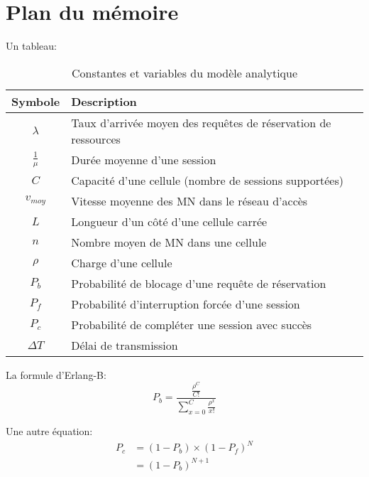 \section{Plan du mémoire}  %
Un tableau:
\begin{table}[htbp]
  \centering
  \caption{Constantes et variables du modèle analytique}
  \begin{tabular}{|c|l|}
    \hline\rowcolor[gray]{0.8}\color{black}
    Symbole         & Description\\\hline
    $\lambda$       & Taux d'arrivée moyen des requêtes de réservation de ressources\\\hline
    $\frac{1}{\mu}$ & Durée moyenne d'une session\\\hline
    $C$             & Capacité d'une cellule (nombre de sessions supportées)\\\hline
    $v_{moy}$       & Vitesse moyenne des MN dans le réseau d'accès\\\hline
    $L$             & Longueur d'un côté d'une cellule carrée\\\hline
    $n$             & Nombre moyen de MN dans une cellule\\\hline
    $\rho$          & Charge d'une cellule\\\hline
    $P_b$           & Probabilité de blocage d'une requête de réservation\\\hline
    $P_f$           & Probabilité d'interruption forcée d'une session\\\hline
    $P_c$           & Probabilité de compléter une session avec succès\\\hline
    $\Delta{}T$     & Délai de transmission\\\hline
  \end{tabular}
  \label{tab:Definitions}
\end{table}

La formule d'\mbox{Erlang-B}:
\begin{equation}
  P_b = \frac{\frac{\rho^C}{C!}}{\sum\limits_{x=0}^{C}\frac{\rho^x}{x!}}
  \label{eq:Pblock}
\end{equation}

Une autre équation:
\begin{equation}
  \begin{split}
    P_c &= (1 - P_b) \times (1 -  P_f)^N\\
        &= (1 - P_b)^{N+1}
  \end{split}
  \label{eq:ProbComplete}
\end{equation}

